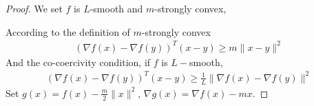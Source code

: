 \documentclass[11pt]{elegantbook}
\begin{document}
\begin{proof}
We set $f$ is $L$-smooth and $m$-strongly convex,

According to the definition of $m$-strongly convex
\begin{equation}
    \begin{aligned}
        (\nabla f(x)-\nabla f(y))^T(x-y)\geq m \|x-y\|^2
    \end{aligned}
    \nonumber
\end{equation}
And the co-coercivity condition, if $f$ is $L-$smooth,
\begin{equation}
    \begin{aligned}
        (\nabla f(x)-\nabla f(y))^T(x-y)\geq \frac{1}{L}\|\nabla f(x)-\nabla f(y)\|^2
    \end{aligned}
    \nonumber
\end{equation}
Set $g(x)=f(x)-\frac{m}{2}\|x\|^2$, $\nabla g(x)=\nabla f(x)-mx$.


\end{proof}
\end{document}
